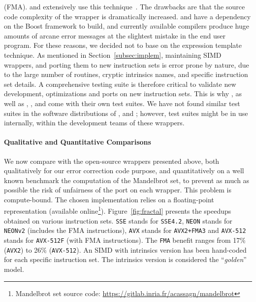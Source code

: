 (FMA). \BoostSIMD and \bSIMD extensively use this
technique~\cite{Esterie2012,Esterie2012a}. The drawbacks are that the source
code complexity of the wrapper is dramatically increased. \BoostSIMD and \bSIMD
have a dependency on the Boost framework to build, and currently available \Cxx
compilers produce huge amounts of arcane error messages at the slightest mistake
in the end user program. For these reasons, we decided not to base \MIPP on the
expression template technique. As mentioned in Section~\ref{subsec:implem},
maintaining SIMD wrappers, and porting them to new instruction sets is error
prone by nature, due to the large number of routines, cryptic intrinsics names,
and specific instruction set details. A comprehensive testing suite is therefore
critical to validate new development, optimizations and ports on new instruction
sets. This is why \MIPP, as well as \Vc, \BoostSIMD, \simdpp and \bSIMD come
with their own test suites. We have not found similar test suites in the
software distributions of \VCL, \xsimd and \TSIMD; however, test suites might be
in use internally, within the development teams of these wrappers.

\paragraph{Qualitative and Quantitative Comparisons}

We now compare \MIPP with the open-source wrappers presented above, both
qualitatively for our error correction code purpose, and quantitatively on a
well known benchmark the computation of the Mandelbrot set, to prevent as much
as possible the risk of unfairness of the port on each wrapper. This problem is
compute-bound. The chosen implementation relies on a floating-point
representation (available online\footnote{Mandelbrot set source code:
\url{https://gitlab.inria.fr/acassagn/mandelbrot}}). Figure~\ref{fig:fractal}
presents the speedups obtained on various instruction sets. \verb|SSE| stands
for \verb|SSE4.2|, \verb|NEON| stands for \verb|NEONv2| (includes the FMA
instructions), \verb|AVX| stands for \verb|AVX2+FMA3| and \verb|AVX-512| stands
for \verb|AVX-512F| (with FMA instructions). The \verb|FMA| benefit ranges from
17\% (\verb|AVX2|) to 26\% (\verb|AVX-512|). An SIMD with intrinsics version has
been hand-coded for each specific instruction set. The intrinsics version is
considered the ``\emph{golden}'' model.

